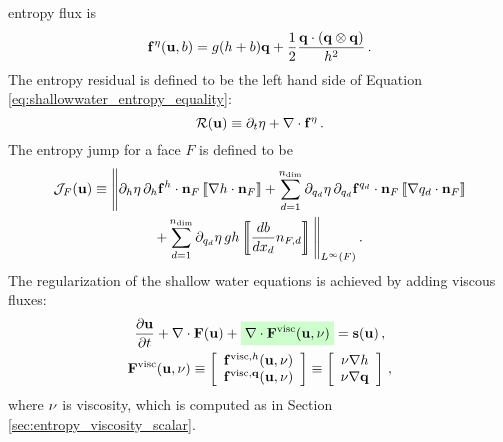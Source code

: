 entropy flux is
\begin{equation}
  \mathbf{f}^\eta(\mathbf{u},b)
  = g(h + b)\mathbf{q}
  + \frac{1}{2}\frac{\mathbf{q}\cdot\left(\mathbf{q}\otimes\mathbf{q}\right)} 
  {h^2}
  \,.
\end{equation}
The entropy residual is defined to be the left hand side of 
Equation \eqref{eq:shallowwater_entropy_equality}:
\begin{equation}
  \mathcal{R}(\mathbf{u}) \equiv \partial_t\eta
  + \nabla\cdot\mathbf{f}^\eta
  \,.
\end{equation}
The entropy jump for a face $F$ is defined to be
\begin{multline}
  \mathcal{J}_F(\mathbf{u})
  \equiv \Bigg\|
    \partial_h\eta \, \partial_h\mathbf{f}^h
      \cdot\mathbf{n}_F
      \left\llbracket\nabla h \cdot \mathbf{n}_F\right\rrbracket
    + \sum\limits_{d=1}^{n_\text{dim}}\partial_{q_d}\eta
      \, \partial_{q_d}\mathbf{f}
        ^{q_d} \cdot\mathbf{n}_F
      \left\llbracket\nabla q_d \cdot \mathbf{n}_F\right\rrbracket
    \\
    + \sum\limits_{d=1}^{n_\text{dim}}\partial_{q_d}\eta
        \, gh
      \left\llbracket\frac{d b}{d x_d}n_{F,d}\right\rrbracket
  \Bigg\|_{L^\infty(F)} \,.
\end{multline}
The regularization of the shallow water equations is achieved by adding
viscous fluxes:
\begin{equation}
\begin{gathered}
  \ppt{\vectorsolution} + \nabla\cdot\consfluxvector
  + \highlightgreen{\nabla\cdot\viscconsfluxvector}
  = \conssource \eqc
\\
  \viscconsfluxvector
  \equiv \left[\begin{array}{c}
    \viscflux{\height}(\vectorsolution,\viscosity)\\
    \viscflux{\heightmomentum}(\vectorsolution,\viscosity)
    \end{array}\right]
  \equiv \left[\begin{array}{c}
    \viscosity\nabla\height\\
    \viscosity\nabla\heightmomentum
    \end{array}\right] \eqc
\end{gathered}
\end{equation}
where $\nu$ is viscosity, which is computed as in Section
\ref{sec:entropy_viscosity_scalar}.
